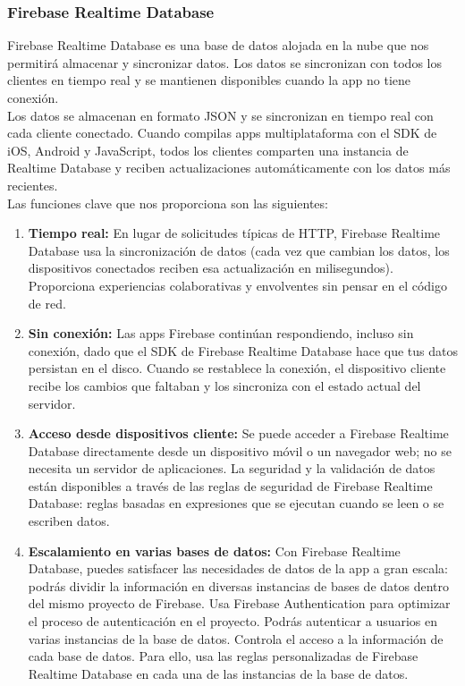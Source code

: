 \subsubsection{Firebase Realtime Database}
Firebase Realtime Database es una base de datos alojada en la nube
 que nos permitirá almacenar y sincronizar datos. Los datos se 
sincronizan con todos los clientes en tiempo real y se mantienen
 disponibles cuando la app no tiene conexión.
\\

Los datos se almacenan en formato JSON y se sincronizan en tiempo real
 con cada cliente conectado. Cuando compilas apps multiplataforma con 
el SDK de iOS, Android y JavaScript, todos los clientes comparten una
 instancia de Realtime Database y reciben actualizaciones automáticamente
 con los datos más recientes.
\\

Las funciones clave que nos proporciona son las siguientes:

\begin{enumerate}
\item \textbf{Tiempo real:}
En lugar de solicitudes típicas de HTTP, Firebase Realtime Database 
usa la sincronización de datos (cada vez que cambian los datos,
 los dispositivos conectados reciben esa actualización en milisegundos).
 Proporciona experiencias colaborativas y envolventes sin pensar en el 
código de red.
\item \textbf{Sin conexión:}
Las apps Firebase continúan respondiendo, incluso sin conexión,
 dado que el SDK de Firebase Realtime Database hace que tus datos
 persistan en el disco. Cuando se restablece la conexión, el dispositivo 
cliente recibe los cambios que faltaban y los sincroniza con el estado 
actual del servidor.
\item \textbf{Acceso desde dispositivos cliente:}
Se puede acceder a Firebase Realtime Database directamente desde 
un dispositivo móvil o un navegador web; no se necesita un servidor 
de aplicaciones. La seguridad y la validación de datos están disponibles 
a través de las reglas de seguridad de Firebase Realtime Database: 
reglas basadas en expresiones que se ejecutan cuando se leen o se 
escriben datos.
\item \textbf{Escalamiento en varias bases de datos:}
Con Firebase Realtime Database, puedes satisfacer las necesidades
 de datos de la app a gran escala: podrás dividir la información en 
diversas instancias de bases de datos dentro del mismo proyecto de
 Firebase. Usa Firebase Authentication para optimizar el proceso de 
autenticación en el proyecto. Podrás autenticar a usuarios en varias
 instancias de la base de datos. Controla el acceso a la información de
 cada base de datos. Para ello, usa las reglas personalizadas de
 Firebase Realtime Database en cada una de las instancias de la
 base de datos.

\end{enumerate}

